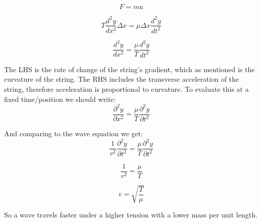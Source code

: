 \[
    F = ma
\]

\[
    T \frac{d^2y}{dx^2} \Delta x = \mu \Delta x \frac{d^2 y}{dt^2}
\]

\[
    \frac{d^2y}{dx^2} = \frac{\mu}{T} \frac{d^2y}{dt^2}
\]

The LHS is the rate of change of the string's gradient, which as mentioned is the curvature of the string. The RHS includes the transverse acceleration of the string, therefore acceleration is proportional to curvature. To evaluate this at a fixed time/position we should write:
\[
    \frac{\partial^2 y}{\partial x^2} = \frac{\mu}{T} \frac{\partial^2 y}{\partial t^2}
\]

And comparing to the wave equation we get:
\[
    \frac{1}{v^2} \frac{\partial^2 y}{\partial t^2} = \frac{\mu}{T} \frac{\partial^2 y}{\partial t^2}
\]

\[
    \frac{1}{v^2} = \frac{\mu}{T}
\]

\[
    v = \sqrt{\frac{T}{\mu}}
\]

So a wave travels faster under a higher tension with a lower mass per unit length.



